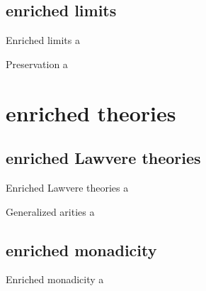 \documentclass{beamer}
\begin{document}
\subsection{enriched limits}
\begin{frame}{Enriched limits}
  a
\end{frame}
\begin{frame}{Preservation}
  a
\end{frame}

\section{enriched theories}
\subsection{enriched Lawvere theories}
\begin{frame}{Enriched Lawvere theories}
  a
\end{frame}
\begin{frame}{Generalized arities}
  a
\end{frame}
\subsection{enriched monadicity}
\begin{frame}{Enriched monadicity}
  a
\end{frame}
\end{document}
